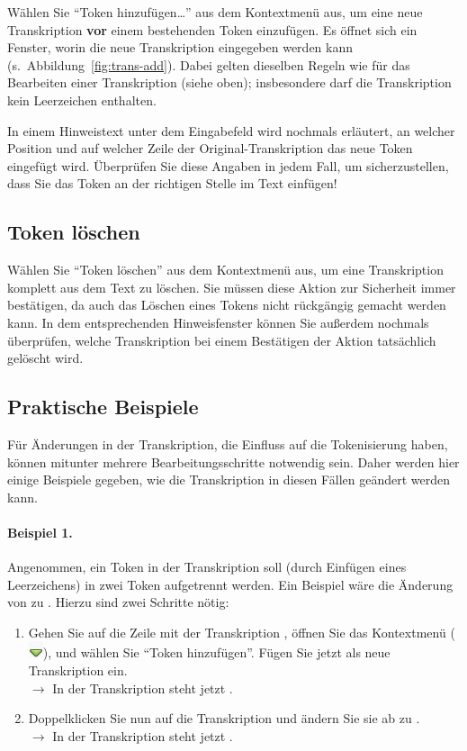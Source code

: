 \documentclass[11pt,a4paper,parskip=half]{scrartcl}
\begin{document}
Wählen Sie "`Token hinzufügen\ldots"' aus dem Kontextmenü aus, um eine
neue Transkription \textbf{vor} einem bestehenden Token einzufügen.
Es öffnet sich ein Fenster, worin die neue Transkription eingegeben
werden kann (s.\ Abbildung~\ref{fig:trans-add}).  Dabei gelten
dieselben Regeln wie für das Bearbeiten einer Transkription (siehe
oben); insbesondere darf die Transkription kein Leerzeichen enthalten.

In einem Hinweistext unter dem Eingabefeld wird nochmals erläutert, an
welcher Position und auf welcher Zeile der Original-Transkription das
neue Token eingefügt wird.  Überprüfen Sie diese Angaben in jedem
Fall, um sicherzustellen, dass Sie das Token an der richtigen Stelle
im Text einfügen!

\subsection{Token löschen}

Wählen Sie "`Token löschen"' aus dem Kontextmenü aus, um eine
Transkription komplett aus dem Text zu löschen.  Sie müssen diese
Aktion zur Sicherheit immer bestätigen, da auch das Löschen eines
Tokens nicht rückgängig gemacht werden kann.  In dem entsprechenden
Hinweisfenster können Sie außerdem nochmals überprüfen, welche
Transkription bei einem Bestätigen der Aktion tatsächlich gelöscht
wird.

\subsection{Praktische Beispiele}
\label{sec:trans-bsp}

Für Änderungen in der Transkription, die Einfluss auf die
Tokenisierung haben, können mitunter mehrere Bearbeitungsschritte
notwendig sein.  Daher werden hier einige Beispiele gegeben, wie die
Transkription in diesen Fällen geändert werden kann.

\paragraph{Beispiel 1.}  Angenommen, ein Token in der Transkription
soll (durch Einfügen eines Leerzeichens) in zwei Token aufgetrennt
werden.  Ein Beispiel wäre die Änderung von  zu
.  Hierzu sind zwei Schritte nötig:
\begin{enumerate}
\item Gehen Sie auf die Zeile mit der Transkription ,
  öffnen Sie das Kontextmenü
  (\includegraphics[height=\baselineskip]{img/dropdown.png}), und
  wählen Sie "`Token hinzufügen"'.  Fügen Sie jetzt  als
  neue Transkription ein.\\$\to$ In der Transkription steht jetzt
  .
\item Doppelklicken Sie nun auf die Transkription  und
  ändern Sie sie ab zu .\\$\to$ In der Transkription steht
  jetzt .
\end{enumerate}
\end{document}
